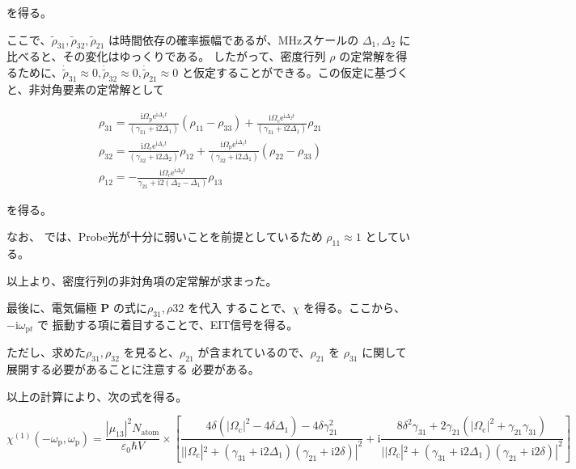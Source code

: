 \documentclass[11pt,a4paper]{ltjsarticle}
\begin{document}
を得る。

ここで、$\tilde {\rho}_{31} , \tilde{ \rho}_{32} , \tilde{ \rho}_{21} $ は時間依存の確率振幅であるが、MHzスケールの $\Delta_{1}, \Delta_{2}$
に比べると、その変化はゆっくりである。
したがって、密度行列 $\rho$ の定常解を得るために、$\dot{ \tilde{\rho}}_{31} \approx 0, \dot{ \tilde{\rho}}_{32} \approx 0, \dot{ \tilde{\rho}}_{21} \approx 0$
と仮定することができる。この仮定に基づくと、非対角要素の定常解として

\begin{gather*}
  \rho_{31} = \frac{ \mathrm{i} \Omega_{\mathrm{p}} \mathrm{e}^{\mathrm{i} \Delta_{1} t}}{ \left( \gamma_{31} + \mathrm{i} 2 \Delta_{1} \right) } \left( \rho_{11} - \rho_{33} \right)
                          + \frac{ \mathrm{i} \Omega_{\mathrm{c}} \mathrm{e}^{\mathrm{i} \Delta_{2} t}}{ \left( \gamma_{31} + \mathrm{i} 2 \Delta_{1} \right)} \rho_{21} \\
  \rho_{32} = \frac{ \mathrm{i} \Omega_{\mathrm{c}} \mathrm{e}^{\mathrm{i} \Delta_{1} t}}{ \left( \gamma_{32} + \mathrm{i} 2 \Delta_{2} \right) }  \rho_{12} 
                          + \frac{ \mathrm{i} \Omega_{\mathrm{p}} \mathrm{e}^{\mathrm{i} \Delta_{1} t}}{ \left( \gamma_{32} + \mathrm{i} 2 \Delta_{1} \right)} \left( \rho_{22} - \rho_{33} \right) \\
  \rho_{12} = - \frac{\mathrm{i} \Omega_{\mathrm{c}} \mathrm{e}^{\mathrm{i} \Delta_{2} t}}{\gamma_{21} + \mathrm{i} 2 \left( \Delta_{2} - \Delta_{1} \right)} \rho_{13}
\end{gather*}

を得る。

なお、\cite{Theory_of_EIT} では、Probe光が十分に弱いことを前提としているため
$\rho_{11} \approx 1$ としている。


以上より、密度行列の非対角項の定常解が求まった。

最後に、電気偏極 $\mathbf{P}$ の式に$\rho_{31}, \rho{32}$ を代入
することで、$\chi$ を得る。ここから、$- \mathrm{i} \omega_{\mathrm{p} t}$ で
振動する項に着目することで、EIT信号を得る。

ただし、求めた$\rho_{31}, \rho_{32}$ 
を見ると、$\rho_{21}$ が含まれているので、$\rho_{21}$ を $\rho_{31}$ に関して展開する必要があることに注意する
必要がある。

以上の計算により、次の式を得る。



\begin{equation*}
  \chi^{(1)} (- \omega_{\mathrm{p}}, \omega_{\mathrm{p}}) = \frac{|\mu_{13}|^2 N_{\mathrm{atom}}}{\varepsilon_{0} \hbar V}
                \times \left[ \frac{4 \delta \left(  |\Omega_{\mathrm{c}}|^2 - 4 \delta \Delta_{1} \right) - 4 \delta \gamma_{21}^2}{ { | |\Omega_{\mathrm{c}}|^2 + \left(\gamma_{31} + \mathrm{i} 2 \Delta_{1}\right) \left( \gamma_{21} + \mathrm{i} 2 \delta \right)| }^2  }
                + \mathrm{i} \frac{8 \delta^2 \gamma_{31} + 2 \gamma_{21} \left( |\Omega_{\mathrm{c}}|^2 + \gamma_{21} \gamma_{31} \right) }{ {| |\Omega_{\mathrm{c}}|^2 + \left(\gamma_{31} + \mathrm{i} 2 \Delta_{1} \right) \left( \gamma_{21} + \mathrm{i} 2 \delta \right)| }^2} \right]
\end{equation*}
\end{document}
